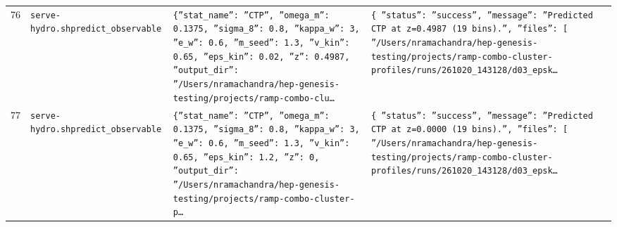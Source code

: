 \documentclass[11pt,a4paper]{article}
\begin{document}
\begin{longtable}{@{}p{}p{}p{}p{}@{}}
76 & \texttt{serve-hydro.sh}\newline\texttt{predict\_\allowbreak{}observable} & \texttt{\{''stat\_\allowbreak{}name'':\allowbreak{} ''CTP'',\allowbreak{} ''omega\_\allowbreak{}m'':\allowbreak{} 0.1375,\allowbreak{} ''sigma\_\allowbreak{}8'':\allowbreak{} 0.8,\allowbreak{} ''kappa\_\allowbreak{}w'':\allowbreak{} 3,\allowbreak{} ''e\_\allowbreak{}w'':\allowbreak{} 0.6,\allowbreak{} ''m\_\allowbreak{}seed'':\allowbreak{} 1.3,\allowbreak{} ''v\_\allowbreak{}kin'':\allowbreak{} 0.65,\allowbreak{} ''eps\_\allowbreak{}kin'':\allowbreak{} 0.02,\allowbreak{} ''z'':\allowbreak{} 0.4987,\allowbreak{} ''output\_\allowbreak{}dir'':\allowbreak{} ''/\allowbreak{}Users/\allowbreak{}nramachandra/\allowbreak{}hep-genesis-testing/\allowbreak{}projects/\allowbreak{}ramp-combo-clu\ldots{}\allowbreak{}} & \texttt{\{   ''status'':\allowbreak{} ''success'',\allowbreak{}   ''message'':\allowbreak{} ''Predicted CTP at z=\allowbreak{}0.4987 (19 bins)\allowbreak{}.'',\allowbreak{}   ''files'':\allowbreak{} [     ''/\allowbreak{}Users/\allowbreak{}nramachandra/\allowbreak{}hep-genesis-testing/\allowbreak{}projects/\allowbreak{}ramp-combo-cluster-profiles/\allowbreak{}runs/\allowbreak{}261020\_\allowbreak{}143128/\allowbreak{}d03\_\allowbreak{}epsk\ldots{}\allowbreak{}} \\
77 & \texttt{serve-hydro.sh}\newline\texttt{predict\_\allowbreak{}observable} & \texttt{\{''stat\_\allowbreak{}name'':\allowbreak{} ''CTP'',\allowbreak{} ''omega\_\allowbreak{}m'':\allowbreak{} 0.1375,\allowbreak{} ''sigma\_\allowbreak{}8'':\allowbreak{} 0.8,\allowbreak{} ''kappa\_\allowbreak{}w'':\allowbreak{} 3,\allowbreak{} ''e\_\allowbreak{}w'':\allowbreak{} 0.6,\allowbreak{} ''m\_\allowbreak{}seed'':\allowbreak{} 1.3,\allowbreak{} ''v\_\allowbreak{}kin'':\allowbreak{} 0.65,\allowbreak{} ''eps\_\allowbreak{}kin'':\allowbreak{} 1.2,\allowbreak{} ''z'':\allowbreak{} 0,\allowbreak{} ''output\_\allowbreak{}dir'':\allowbreak{} ''/\allowbreak{}Users/\allowbreak{}nramachandra/\allowbreak{}hep-genesis-testing/\allowbreak{}projects/\allowbreak{}ramp-combo-cluster-p\ldots{}\allowbreak{}} & \texttt{\{   ''status'':\allowbreak{} ''success'',\allowbreak{}   ''message'':\allowbreak{} ''Predicted CTP at z=\allowbreak{}0.0000 (19 bins)\allowbreak{}.'',\allowbreak{}   ''files'':\allowbreak{} [     ''/\allowbreak{}Users/\allowbreak{}nramachandra/\allowbreak{}hep-genesis-testing/\allowbreak{}projects/\allowbreak{}ramp-combo-cluster-profiles/\allowbreak{}runs/\allowbreak{}261020\_\allowbreak{}143128/\allowbreak{}d03\_\allowbreak{}epsk\ldots{}\allowbreak{}} \\

\end{longtable}
\end{document}
